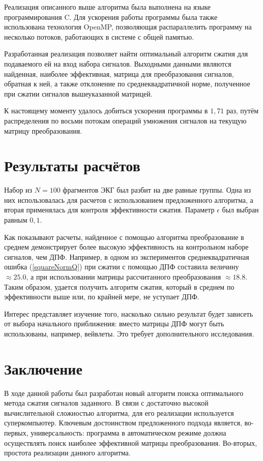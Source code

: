 \documentclass[11pt, oneside, a4paper]{article}
\begin{document}
Реализация описанного выше алгоритма была выполнена на языке программирования C. Для ускорения работы программы была также использована технология OpenMP, позволяющая распараллелить программу на несколько потоков, работающих в системе с общей памятью. 

Разработанная реализация позволяет найти оптимальный алгоритм сжатия для подаваемого ей на вход набора сигналов. Выходными данными являются найденная, наиболее эффективная, матрица для преобразования сигналов, обратная к ней, а также отклонение по среднеквадратичной норме, полученное при сжатии сигналов вышеуказанной матрицей.

К настоящему моменту удалось добиться ускорения программы в $1,71$ раз, путём распределения по восьми потокам операций умножения сигналов на текущую матрицу преобразования. 

\section{Результаты расчётов}

Набор из $N = 100$ фрагментов ЭКГ был разбит на две равные группы. Одна из них использовалась для расчетов с использованием предложенного алгоритма, а вторая применялась для контроля эффективности сжатия. Параметр $\epsilon$ был выбран равным $0,1$.

Как показывают расчеты, найденное с помощью алгоритма преобразование в среднем демонстрирует более высокую эффективность на контрольном наборе сигналов, чем ДПФ. Например, в одном из экспериментов среднеквадратичная ошибка (\ref{squareNormQ}) при сжатии с помощью ДПФ составила величину $\approx25.0$, а  при использовании матрицы рассчитанного преобразования $\approx18.8$. Таким образом, удается получить алгоритм сжатия, который в среднем по эффективности выше или, по крайней мере, не уступает ДПФ.

Интерес представляет изучение того, насколько сильно результат будет зависеть от выбора начального приближения: вместо матрицы ДПФ могут быть использованы, например, вейвлеты. Это требует дополнительного исследования. 


\section{Заключение}

В ходе данной работы был разработан новый алгоритм поиска оптимального метода сжатия сигналов заданного. В связи с достаточно высокой вычислительной сложностью алгоритма, для его реализации используется суперкомпьютер. Ключевым достоинством предложенного подхода является, во-первых, универсальность: программа в автоматическом режиме должна осуществлять поиск наиболее эффективной матрицы преобразования. Во-вторых, простота реализации данного алгоритма.
\end{document}
